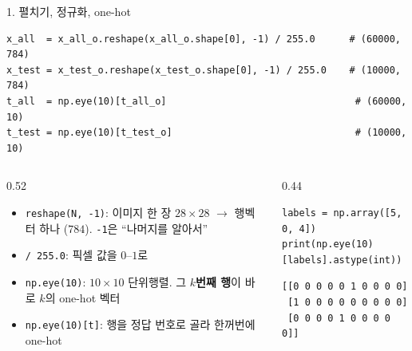 \documentclass[aspectratio=169,11pt]{beamer}
\newcommand{\code}[1]{\texttt{#1}}
\begin{document}
\begin{frame}[fragile]{1. 펼치기, 정규화, one-hot}
\begin{lstlisting}
x_all  = x_all_o.reshape(x_all_o.shape[0], -1) / 255.0      # (60000, 784)
x_test = x_test_o.reshape(x_test_o.shape[0], -1) / 255.0    # (10000, 784)
t_all  = np.eye(10)[t_all_o]                                 # (60000, 10)
t_test = np.eye(10)[t_test_o]                                # (10000, 10)
\end{lstlisting}
\begin{columns}[T,onlytextwidth]
\begin{column}{0.52\textwidth}
\small
\begin{itemize}
\item \code{reshape(N, -1)}: 이미지 한 장 $28\times28$ $\to$ 행벡터 하나 ($784$). \code{-1}은 ``나머지를 알아서''
\item \code{/ 255.0}: 픽셀 값을 $0$--$1$로
\item \code{np.eye(10)}: $10\times10$ 단위행렬. 그 \textbf{$k$번째 행}이 바로 $k$의 one-hot 벡터
\item \code{np.eye(10)[t]}: 행을 정답 번호로 골라 한꺼번에 one-hot
\end{itemize}
\end{column}
\begin{column}{0.44\textwidth}
\begin{lstlisting}
labels = np.array([5, 0, 4])
print(np.eye(10)[labels].astype(int))
\end{lstlisting}
\begin{lstlisting}[style=outstyle]
[[0 0 0 0 0 1 0 0 0 0]
 [1 0 0 0 0 0 0 0 0 0]
 [0 0 0 0 1 0 0 0 0 0]]
\end{lstlisting}
\end{column}
\end{columns}
\end{frame}
\end{document}

